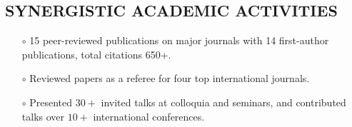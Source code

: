 \documentclass[10pt]{res}
\newcommand{\blockline}{\noindent\hspace{-0.03\textwidth}
{\rule{1.03\textwidth}{0.8pt}}}
\begin{document}
\begin{resume}
\section{\large SYNERGISTIC ACADEMIC ACTIVITIES}
\vspace{-0.2cm}
\noindent{\blockline}
\begin{itemize} [leftmargin=0.0cm]
 \item[$\circ$] 15 peer-reviewed publications on major journals with 14 first-author publications, total citations 650+. 
 \item[$\circ$] Reviewed papers as a referee for four top international journals. 
 \item[$\circ$] Presented $30+$ invited talks at colloquia and seminars, and contributed talks over $10+$ international conferences.
\end{itemize} 

\end{resume}
\end{document}
